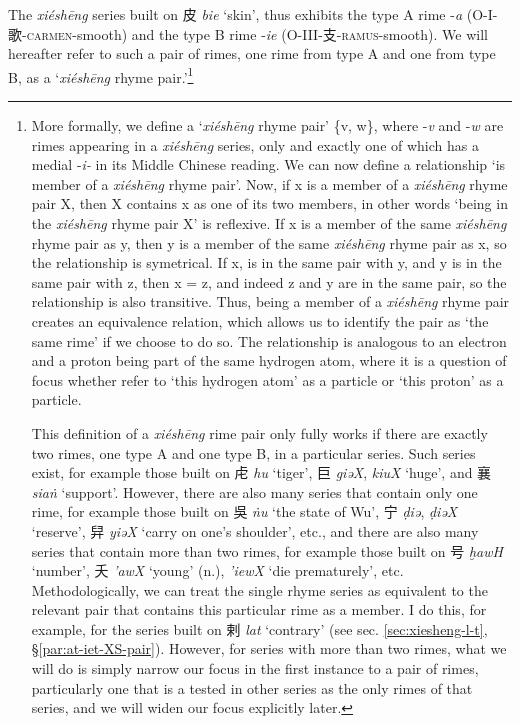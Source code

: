 The \textit{xiéshēng} series built on 皮 \textit{bie} `skin', thus exhibits the type A rime -\textit{a} 
 (O-I-歌-\textsc{carmen}-smooth) 
and the type B rime -\textit{ie} (O-III-支-\textsc{ramus}-smooth). We will hereafter refer to such a pair of rimes, one rime from type A and one from type B, as a  `\textit{xiéshēng} rhyme pair.'\footnote{More formally, we define a `\textit{xiéshēng} rhyme pair' \{v, w\}, where -\textit{v} and -\textit{w} are rimes appearing in a \textit{xiéshēng} series, only and exactly one of which has a medial -\textit{i-} in its Middle Chinese reading. We can now define a relationship `is member of a \textit{xiéshēng} rhyme pair'. Now, if x is a member of a \textit{xiéshēng} rhyme pair X, then X contains x as one of its two members, in other words `being in the \textit{xiéshēng} rhyme pair X' is reflexive. If x is a member of the same \textit{xiéshēng} rhyme pair as y, then y is a member of the same  \textit{xiéshēng} rhyme pair as x, so the relationship is symetrical. If x, is in the same pair with y, and y is in the same pair with z, then x = z, and indeed z and y are in the same pair, so the relationship is also transitive. Thus, being a member of a \textit{xiéshēng} rhyme pair creates an equivalence relation, which allows us to identify the pair as `the same rime' if we choose to do so. The relationship is analogous to an electron and a proton being part of the same hydrogen atom, where it is a question of focus whether refer to `this hydrogen atom' as a particle or `this proton' as a particle.

This definition of a \textit{xiéshēng} rime pair only fully works if there are exactly two rimes, one type A and one type B, in a particular series. Such series exist, for example those built on  虍 \textit{hu} `tiger',   巨 \textit{giəX}, \textit{kiuX} `huge', and 襄 \textit{siaṅ} `support'. However, there are also many series that contain only one rime, for example those built on 吳 \textit{ṅu} `the state of Wu',  宁 \textit{ḍiə}, \textit{ḍiəX} `reserve', 舁 \textit{yiəX} `carry on one's shoulder', etc., and there are also many series that contain more than two rimes, for example those built on 号 \textit{ḫawH} `number',  夭 \textit{'awX} `young' (n.), \textit{'iewX} `die prematurely', etc. Methodologically, we can treat the single rhyme series as equivalent to the relevant pair that contains this particular rime as a member. I do this, for example, for the series built on 剌 \textit{lat}  `contrary' (see sec. \ref{sec:xiesheng-l-t}, §\ref{par:at-iet-XS-pair}).
However, for series with more than two rimes, what we will do is simply narrow our focus in the first instance to a pair of rimes, particularly one that is a tested in other series as the only rimes of that series, and we will widen our focus explicitly later.} 
